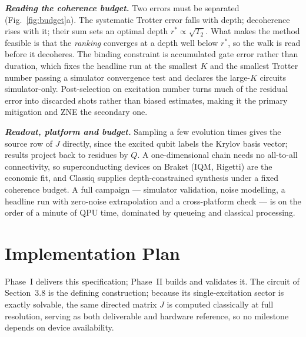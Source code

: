 \documentclass[10pt,a4paper]{article}
\newcommand{\lead}[1]{\textbf{\textit{#1}}}
\begin{document}
\lead{Reading the coherence budget.} Two errors must be separated (Fig.~\ref{fig:budget}a). The
systematic Trotter error falls with depth; decoherence rises with it; their sum sets an optimal depth
$r^{*}\propto\sqrt{T_2}$. What makes the method feasible is that the \emph{ranking} converges at a
depth well below $r^{*}$, so the walk is read before it decoheres. The binding constraint is
accumulated gate error rather than duration, which fixes the headline run at the smallest $K$ and the
smallest Trotter number passing a simulator convergence test and declares the large-$K$ circuits
simulator-only. Post-selection on excitation number turns much of the residual error into discarded
shots rather than biased estimates, making it the primary mitigation and ZNE the secondary one.

\lead{Readout, platform and budget.} Sampling a few evolution times gives the source row of $J$
directly, since the excited qubit labels the Krylov basis vector; results project back to residues by
$Q$. A one-dimensional chain needs no all-to-all connectivity, so superconducting devices on Braket
(IQM, Rigetti) are the economic fit, and Classiq supplies depth-constrained synthesis under a fixed
coherence budget. A full campaign --- simulator validation, noise modelling, a headline run with
zero-noise extrapolation and a cross-platform check --- is on the order of a minute of QPU time,
dominated by queueing and classical processing.

\section{Implementation Plan}

Phase~I delivers this specification; Phase~II builds and validates it. The circuit of Section~3.8 is
the defining construction; because its single-excitation sector is exactly solvable, the same directed
matrix $J$ is computed classically at full resolution, serving as both deliverable and hardware
reference, so no milestone depends on device availability.
\end{document}
